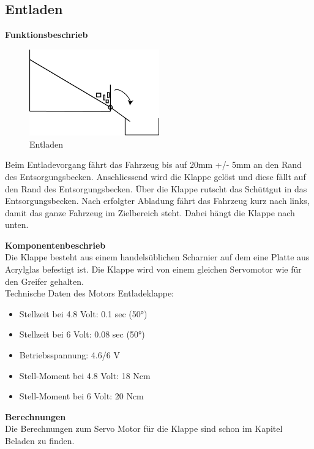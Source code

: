 \subsection{Entladen}

\textbf{Funktionsbeschrieb}\\[0.2cm]
\begin{figure}[H]
\centering
\includegraphics[width=0.5\textwidth]{03_Loesungskonzept/pictures/Entladen_Schraegbehaelter.png}
\caption{Entladen}
\end{figure}

Beim Entladevorgang fährt das Fahrzeug bis auf 20mm +/- 5mm an den Rand des Entsorgungsbecken. Anschliessend wird die Klappe gelöst und diese fällt auf den Rand des Entsorgungsbecken. Über die Klappe rutscht das Schüttgut in das Entsorgungsbecken. Nach erfolgter Abladung fährt das Fahrzeug kurz nach links, damit das ganze Fahrzeug im Zielbereich steht. Dabei hängt die Klappe nach unten.

\textbf{Komponentenbeschrieb}\\[0.2cm]
Die Klappe besteht aus einem handelsüblichen Scharnier auf dem eine Platte aus Acrylglas befestigt ist.
Die Klappe wird von einem gleichen Servomotor wie für den Greifer gehalten.\\
Technische Daten des Motors Entladeklappe:
\begin{itemize}
\item Stellzeit bei 4.8 Volt: 0.1 sec (50°) 
\item Stellzeit bei 6 Volt: 0.08 sec (50°) 
\item Betriebsspannung: 4.6/6 V
\item Stell-Moment bei 4.8 Volt: 18 Ncm
 \item Stell-Moment bei 6 Volt: 20 Ncm 
\end{itemize}

\textbf{Berechnungen}\\[0.2cm]
Die Berechnungen zum Servo Motor für die Klappe sind schon im Kapitel Beladen zu finden.